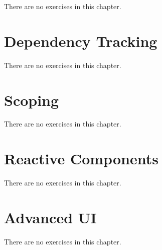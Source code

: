 \documentclass[
]{book}
\theoremstyle{definition}
\theoremstyle{definition}
\theoremstyle{definition}
\theoremstyle{definition}
\theoremstyle{remark}
\begin{document}
There are no exercises in this chapter.

\hypertarget{dependency-tracking}{%
\chapter{Dependency Tracking}\label{dependency-tracking}}

There are no exercises in this chapter.

\hypertarget{scoping}{%
\chapter{Scoping}\label{scoping}}

There are no exercises in this chapter.

\hypertarget{reactive-components}{%
\chapter{Reactive Components}\label{reactive-components}}

There are no exercises in this chapter.

\hypertarget{advanced-ui}{%
\chapter{Advanced UI}\label{advanced-ui}}

There are no exercises in this chapter.

  
\end{document}
